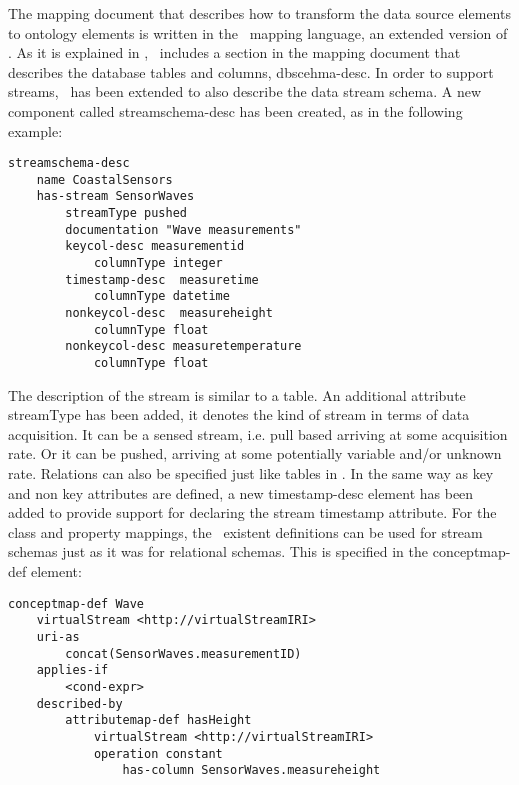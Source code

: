 The mapping document that describes how to transform the data source elements to ontology elements is written in the
\stwoo\ mapping language, an extended version of \rtwoo. As it is explained in \cite{Barrasa_04}, \rtwoo\ includes a
section in the mapping document that describes the database tables and columns, \textsf{dbscehma-desc}. In order to
support streams, \rtwoo\ has been extended to also describe the data stream schema. A new component called
\textsf{streamschema-desc} has been created, as in the following example:

\begin{lstlisting}[style=R2OStyle,language=R2O,frame=none]
streamschema-desc
    name CoastalSensors
    has-stream SensorWaves
        streamType pushed
        documentation "Wave measurements"
        keycol-desc measurementid
            columnType integer
        timestamp-desc  measuretime
            columnType datetime
        nonkeycol-desc  measureheight
            columnType float
        nonkeycol-desc measuretemperature
            columnType float
\end{lstlisting}
The description of the stream is similar to a table. An additional attribute \textsf{streamType} has been added, it denotes the kind of stream in terms of data acquisition. It can be a sensed stream, i.e. pull based arriving at some acquisition rate. Or it can be pushed, arriving at some potentially variable and/or unknown rate. Relations can also be specified just like tables in \stwoo. In the same way as key and non key attributes are defined, a new \textsf{timestamp-desc} element has been added to provide support for declaring the stream timestamp attribute.
For the class and property mappings, the \rtwoo\ existent definitions can be used for stream schemas just as it was for relational schemas. This is specified in the \textsf{conceptmap-def} element:
\begin{lstlisting}[style=R2OStyle,language=R2O,frame=none]
conceptmap-def Wave
    virtualStream <http://virtualStreamIRI>
    uri-as
        concat(SensorWaves.measurementID)
    applies-if
        <cond-expr>
    described-by
        attributemap-def hasHeight
            virtualStream <http://virtualStreamIRI>
            operation constant
                has-column SensorWaves.measureheight
\end{lstlisting}
